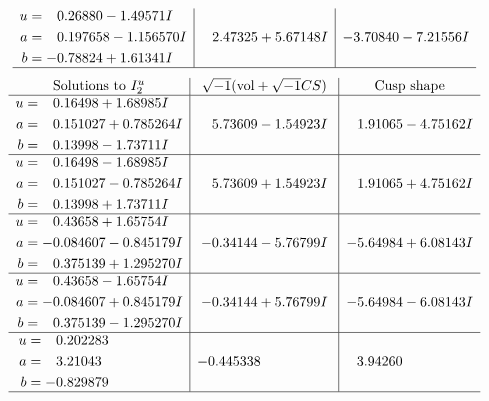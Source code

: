 \documentclass[1p]{elsarticle_modified}
\theoremstyle{definition}
\newcommand{\I}{\sqrt{-1}}
\begin{document}
$$\begin{array}{c|c|c}
\begin{aligned}
u &= \phantom{-}0.26880 - 1.49571 I \\
a &= \phantom{-}0.197658 - 1.156570 I \\
b &= -0.78824 + 1.61341 I\end{aligned}
 & \phantom{-}2.47325 + 5.67148 I & -3.70840 - 7.21556 I\\
 \hline 
 \end{array}$$\newpage$$\begin{array}{c|c|c}  
\text{Solutions to }I^u_{2}& \I (\text{vol} + \sqrt{-1}CS) & \text{Cusp shape}\\
 \hline 
\begin{aligned}
u &= \phantom{-}0.16498 + 1.68985 I \\
a &= \phantom{-}0.151027 + 0.785264 I \\
b &= \phantom{-}0.13998 - 1.73711 I\end{aligned}
 & \phantom{-}5.73609 - 1.54923 I & \phantom{-}1.91065 - 4.75162 I \\ \hline\begin{aligned}
u &= \phantom{-}0.16498 - 1.68985 I \\
a &= \phantom{-}0.151027 - 0.785264 I \\
b &= \phantom{-}0.13998 + 1.73711 I\end{aligned}
 & \phantom{-}5.73609 + 1.54923 I & \phantom{-}1.91065 + 4.75162 I \\ \hline\begin{aligned}
u &= \phantom{-}0.43658 + 1.65754 I \\
a &= -0.084607 - 0.845179 I \\
b &= \phantom{-}0.375139 + 1.295270 I\end{aligned}
 & -0.34144 - 5.76799 I & -5.64984 + 6.08143 I \\ \hline\begin{aligned}
u &= \phantom{-}0.43658 - 1.65754 I \\
a &= -0.084607 + 0.845179 I \\
b &= \phantom{-}0.375139 - 1.295270 I\end{aligned}
 & -0.34144 + 5.76799 I & -5.64984 - 6.08143 I \\ \hline\begin{aligned}
u &= \phantom{-}0.202283\phantom{ +0.000000I} \\
a &= \phantom{-}3.21043\phantom{ +0.000000I} \\
b &= -0.829879\phantom{ +0.000000I}\end{aligned}
 & -0.445338\phantom{ +0.000000I} & \phantom{-}3.94260\phantom{ +0.000000I}\\
 \hline 
 \end{array}$$\newpage
\end{document}
